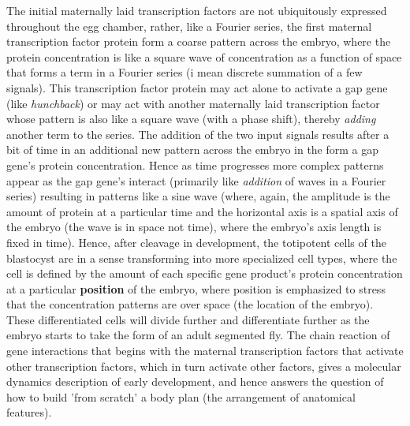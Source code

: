 The initial maternally laid transcription factors are not ubiquitously expressed throughout the egg chamber, rather, like a Fourier series, the first maternal transcription factor protein form a coarse pattern across the embryo, where the protein concentration is like a square wave of concentration as a function of space that forms a term in a Fourier series (i mean discrete summation of a few signals).  This transcription factor protein may act alone to activate a gap gene (like \textit{hunchback}) or may act with another maternally laid transcription factor whose pattern is also like a square wave (with a phase shift), thereby \textit{adding} another term to the series.  The addition of the two input signals results after a bit of time in an additional new pattern across the embryo in the form a gap gene's protein concentration.  Hence as time progresses more complex patterns appear as the gap gene's interact (primarily like \textit{addition} of waves in a Fourier series) resulting in patterns like a sine wave (where, again, the amplitude is the amount of protein at a particular time and the horizontal axis is a spatial axis of the embryo (the wave is in space not time), where the embryo's axis length is fixed in time).  Hence, after cleavage in development, the totipotent cells of the blastocyst are in a sense transforming into more specialized cell types, where the cell is defined by the amount of each specific gene product's protein concentration at a particular \textbf{position} of the embryo, where position is emphasized to stress that the concentration patterns are over space (the location of the embryo).  These differentiated cells will divide further and differentiate further as the embryo starts to take the form of an adult segmented fly.  The chain reaction of gene interactions that begins with the maternal transcription factors that activate other transcription factors, which in turn activate other factors, gives a molecular dynamics description of early development, and hence answers the question of how to build 'from scratch' a body plan (the arrangement of anatomical features).  

